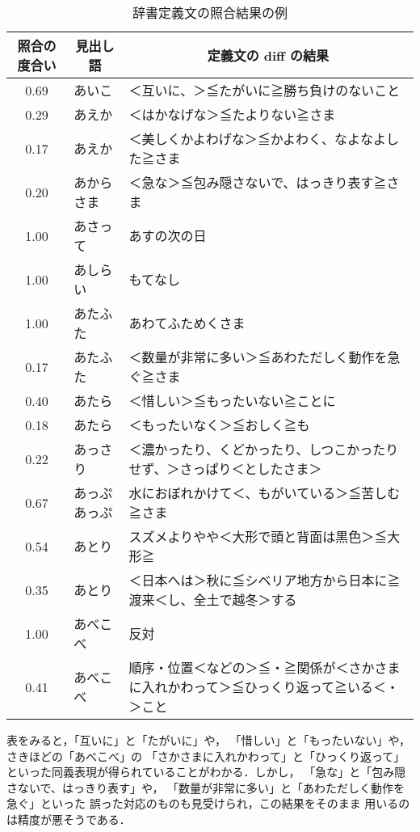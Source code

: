 \begin{table*}[t]
  \begin{center}
    \leavevmode
    \caption{辞書定義文の照合結果の例}
    \label{tab:jisho_shougou_rei}
\begin{tabular}[h]{|c|l|p{8cm}|}\hline
\multicolumn{1}{|c|}{照合の度合い} & \multicolumn{1}{|c|}{見出し語} & \multicolumn{1}{|c|}{定義文の diff の結果}\\\hline
0.69&あいこ&＜互いに、＞≦たがいに≧勝ち負けのないこと\\
0.29&あえか&＜はかなげな＞≦たよりない≧さま\\
0.17&あえか&＜美しくかよわげな＞≦かよわく、なよなよした≧さま\\
0.20&あからさま&＜急な＞≦包み隠さないで、はっきり表す≧さま\\
1.00&あさって&あすの次の日\\
1.00&あしらい&もてなし\\
1.00&あたふた&あわてふためくさま\\
0.17&あたふた&＜数量が非常に多い＞≦あわただしく動作を急ぐ≧さま\\
0.40&あたら&＜惜しい＞≦もったいない≧ことに\\
0.18&あたら&＜もったいなく＞≦おしく≧も\\
0.22&あっさり&＜濃かったり、くどかったり、しつこかったりせず、＞さっぱり＜としたさま＞\\
0.67&あっぷあっぷ&水におぼれかけて＜、もがいている＞≦苦しむ≧さま\\
0.54&あとり&スズメよりやや＜大形で頭と背面は黒色＞≦大形≧\\
0.35&あとり&＜日本へは＞秋に≦シベリア地方から日本に≧渡来＜し、全土で越冬＞する\\
1.00&あべこべ&反対\\
0.41&あべこべ&順序・位置＜などの＞≦・≧関係が＜さかさまに入れかわって＞≦ひっくり返って≧いる＜・＞こと\\\hline
\end{tabular}
  \end{center}
\end{table*}

表をみると，「互いに」と「たがいに」や，
「惜しい」と「もったいない」や，さきほどの「あべこべ」の
「さかさまに入れかわって」と「ひっくり返って」
といった同義表現が得られていることがわかる．しかし，
「急な」と「包み隠さないで、はっきり表す」や，
「数量が非常に多い」と「あわただしく動作を急ぐ」といった
誤った対応のものも見受けられ，この結果をそのまま
用いるのは精度が悪そうである．

